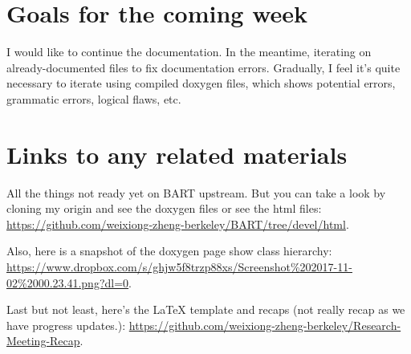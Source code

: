 \documentclass{article}
\begin{document}
\section{Goals for the coming week}
I would like to continue the documentation. In the meantime, iterating on already-documented files to fix documentation errors. Gradually, I feel it's quite necessary to iterate using compiled doxygen files, which shows potential errors, grammatic errors, logical flaws, etc.

\section{Links to any related materials}
All the things not ready yet on BART upstream. But you can take a look by cloning my origin and see the doxygen files or see the html files:  \url{https://github.com/weixiong-zheng-berkeley/BART/tree/devel/html}.

Also, here is a snapshot of the doxygen page show class hierarchy: \url{https://www.dropbox.com/s/ghjw5f8trzp88xs/Screenshot%202017-11-02%2000.23.41.png?dl=0}.
	
Last but not least, here's the LaTeX template and recaps (not really recap as we have progress updates.): \url{https://github.com/weixiong-zheng-berkeley/Research-Meeting-Recap}.




%
%
%

\end{document}
